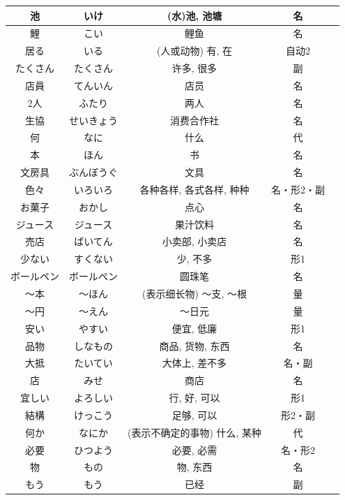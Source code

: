 \begin{longtable}{|c|c|c|c|c|}
池 & いけ & (水)池, 池塘 & 名 & \\ \hline
鯉 & こい & 鲤鱼 & 名 & \\ \hline
居る & いる & (人或动物) 有, 在 & 自动2 & \\ \hline
たくさん & たくさん & 许多, 很多 & 副 & \\ \hline
店員 & てんいん & 店员 & 名 & \\ \hline
2人 & ふたり & 两人 & 名 & \\ \hline
生協 & せいきょう & 消费合作社 & 名 & \\ \hline
何 & なに & 什么 & 代 & \\ \hline
本 & ほん & 书 & 名 & \\ \hline
文房具 & ぶんぼうぐ & 文具 & 名 & \\ \hline
色々 & いろいろ & 各种各样, 各式各样, 种种 & 名・形2・副 & \\ \hline
お菓子 & おかし & 点心 & 名 & \\ \hline
ジュース & ジュース & 果汁饮料 & 名 & \\ \hline
売店 & ばいてん & 小卖部, 小卖店 & 名 & \\ \hline
少ない & すくない & 少, 不多 & 形1 & \\ \hline
ボールペン & ボールペン & 圆珠笔 & 名 & \\ \hline
〜本 & 〜ほん & (表示细长物) 〜支, 〜根 & 量 & \\ \hline
〜円 & 〜えん & 〜日元 & 量 & \\ \hline
安い & やすい & 便宜, 低廉 & 形1 & \\ \hline
品物 & しなもの & 商品, 货物, 东西 & 名 & \\ \hline
大抵 & たいてい & 大体上, 差不多 & 名・副 & \\ \hline
店 & みせ & 商店 & 名 & \\ \hline
宜しい & よろしい & 行, 好, 可以 & 形1 & \\ \hline
結構 & けっこう & 足够, 可以 & 形2・副 & \\ \hline
何か & なにか & (表示不确定的事物) 什么, 某种 & 代 & \\ \hline
必要 & ひつよう & 必要, 必需 & 名・形2 & \\ \hline
物 & もの & 物, 东西 & 名 & \\ \hline
もう & もう & 已经 & 副 & \\ \hline
\end{longtable}
